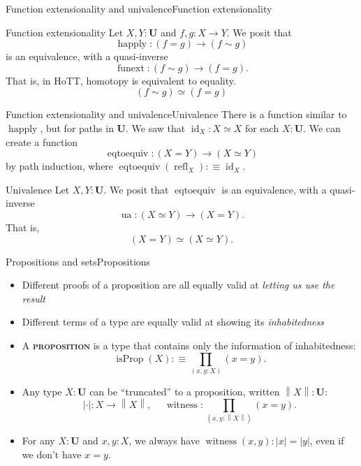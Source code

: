 \documentclass{beamer}
\newcommand{\defn}[1]{{\scshape\bfseries\color{MPBemph}#1}}
\newcommand{\eql}{\mathbin{:\equiv}}
\newcommand{\U}{\textbf{U}}
\newcommand{\tpi}[1]{\prod_{(#1)}}
\newcommand{\1}{\textbf{1}}
\newcommand{\0}{\mathbf{0}}
\newcommand{\2}{\textbf{2}}
\DeclareMathOperator{\refl}{refl}
\DeclareMathOperator{\id}{id}
\DeclareMathOperator{\happly}{happly}
\DeclareMathOperator{\funext}{funext}
\DeclareMathOperator{\eqtoequiv}{eqtoequiv}
\DeclareMathOperator{\ua}{ua}
\DeclareMathOperator{\isProp}{isProp}
\DeclareMathOperator{\witness}{witness}
\newcommand{\abs}[1][\cdot]{\left|#1\right|}
\newcommand{\norm}[1][\cdot]{\left\|#1\right\|}
\begin{document}
\begin{frame}{Function extensionality and univalence}{Function extensionality}
\begin{axiom*}{Function extensionality} Let \( X, Y : \U \) and \( f, g : X \to Y \). We posit that
\[ \happly : (f = g) \to (f \sim g) \]
is an equivalence, with a quasi-inverse
\[ \funext : (f \sim g) \to (f = g). \]
That is, in HoTT, homotopy is equivalent to equality.
\[ (f \sim g) \simeq (f = g) \]
\end{axiom*} \end{frame}
\begin{frame}{Function extensionality and univalence}{Univalence}
There is a function similar to \( \happly \), but for paths in \( \U \). We saw that \( \id_{X} : X \simeq X \) for each \( X : \U \). We can create a function
\[ \eqtoequiv : (X = Y) \to (X \simeq Y) \]
by path induction, where \( \eqtoequiv(\refl_{X}) \eql \id_{X} \).
\pause
\begin{axiom*}{Univalence} Let \( X, Y : \U \). We posit that \( \eqtoequiv \) is an equivalence, with a quasi-inverse
\[ \ua : (X \simeq Y) \to (X = Y). \]
That is,
\[ (X = Y) \simeq (X \simeq Y). \]
\end{axiom*} \end{frame}
\begin{frame}{Propositions and sets}{Propositions}\small
\begin{itemize}[<+- >]
	\item Different proofs of a proposition are all equally valid at \emph{letting us use the result}
	\item Different terms of a type are equally valid at showing its \emph{inhabitedness}
	\item A \defn{proposition} is a type that contains only the information of inhabitedness:
	\[ \isProp(X) \eql \tpi{x, y : X} (x = y). \]
	\item Any type \( X : \U \) can be ``truncated'' to a proposition, written \( \norm[X] : \U \):
	\[ \abs : X \to \norm[X], \hspace{15pt} \witness : \tpi{x, y : \norm[X]} (x = y). \]
	\item For any \( X : \U \) and \( x, y : X \), we always have \( \witness(x, y) : \abs[x] = \abs[y] \), even if we don't have \( x = y \).
\end{itemize} \end{frame}
\end{document}
